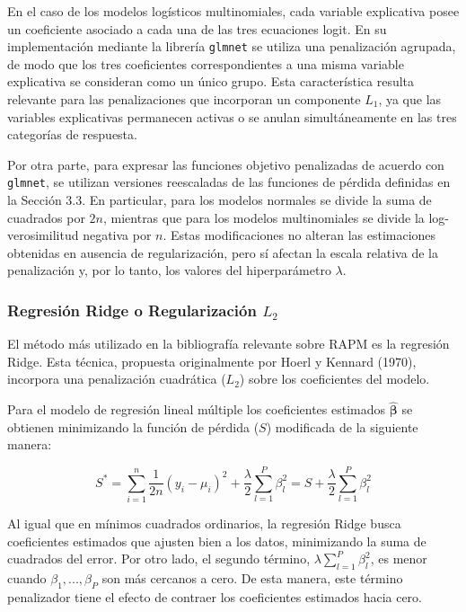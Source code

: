 \documentclass[
  12pt,
]{article}
\begin{document}
En el caso de los modelos logísticos multinomiales, cada variable
explicativa posee un coeficiente asociado a cada una de las tres
ecuaciones logit. En su implementación mediante la librería
\texttt{glmnet} se utiliza una penalización agrupada, de modo que los
tres coeficientes correspondientes a una misma variable explicativa se
consideran como un único grupo. Esta característica resulta relevante
para las penalizaciones que incorporan un componente \(L_1\), ya que las
variables explicativas permanecen activas o se anulan simultáneamente en
las tres categorías de respuesta.

Por otra parte, para expresar las funciones objetivo penalizadas de
acuerdo con \texttt{glmnet}, se utilizan versiones reescaladas de las
funciones de pérdida definidas en la Sección 3.3. En particular, para
los modelos normales se divide la suma de cuadrados por \(2n\), mientras
que para los modelos multinomiales se divide la log-verosimilitud
negativa por \(n\). Estas modificaciones no alteran las estimaciones
obtenidas en ausencia de regularización, pero sí afectan la escala
relativa de la penalización y, por lo tanto, los valores del
hiperparámetro \(\lambda\).

\subsubsection{\texorpdfstring{Regresión Ridge o Regularización
\(L_2\)}{Regresión Ridge o Regularización L\_2}}\label{regresiuxf3n-ridge-o-regularizaciuxf3n-l_2}

El método más utilizado en la bibliografía relevante sobre RAPM es la
regresión Ridge. Esta técnica, propuesta originalmente por Hoerl y
Kennard (1970), incorpora una penalización cuadrática (\(L_2\)) sobre
los coeficientes del modelo.

Para el modelo de regresión lineal múltiple los coeficientes estimados
\(\hat{\boldsymbol{\beta}}\) se obtienen minimizando la función de
pérdida (\(S\)) modificada de la siguiente manera:

\begin{equation}
S^*= \sum_{i=1}^n \frac{1}{2n} (y_i-\mu_i)^2 + \frac{\lambda}{2} \sum_{l=1}^P \beta_l^2=S+\frac{\lambda}{2} \sum_{l=1}^P \beta_l^2
\end{equation}

Al igual que en mínimos cuadrados ordinarios, la regresión Ridge busca
coeficientes estimados que ajusten bien a los datos, minimizando la suma
de cuadrados del error. Por otro lado, el segundo término,
\(\lambda \sum_{l=1}^P \beta_l^2\), es menor cuando
\(\beta_1,...,\beta_P\) son más cercanos a cero. De esta manera, este
término penalizador tiene el efecto de contraer los coeficientes
estimados hacia cero.
\end{document}
